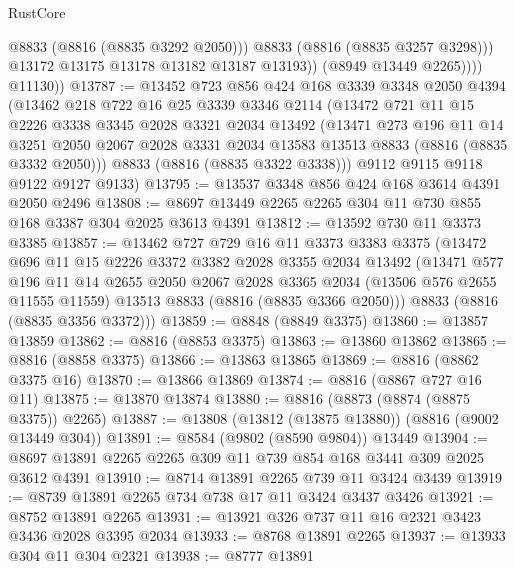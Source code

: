 \begin{lexlean}{RustCore}
\begin{coremodule}
                      @8833
                      (@8816 (@8835 @3292 @2050)))
                    @8833
                    (@8816 (@8835 @3257 @3298)))
                  @13172
                  @13175
                  @13178
                  @13182
                  @13187
                  @13193))
              (@8949 @13449 @2265))))
        @11130))
@13787 := @13452
    @723
    @856
    @424
    @168
    @3339
    @3348
    @2050
    @4394
    (@13462
      @218
      @722
      @16
      @25
      @3339
      @3346
      @2114
      (@13472
        @721
        @11
        @15
        @2226
        @3338
        @3345
        @2028
        @3321
        @2034
        @13492
        (@13471
          @273
          @196
          @11
          @14
          @3251
          @2050
          @2067
          @2028
          @3331
          @2034
          @13583
          @13513
          @8833
          (@8816 (@8835 @3332 @2050)))
        @8833
        (@8816 (@8835 @3322 @3338)))
      @9112
      @9115
      @9118
      @9122
      @9127
      @9133)
@13795 := @13537 @3348 @856 @424 @168 @3614 @4391 @2050 @2496
@13808 := @8697 @13449 @2265 @2265 @304 @11 @730 @855 @168 @3387 @304 @2025 @3613 @4391
@13812 := @13592 @730 @11 @3373 @3385
@13857 := @13462
    @727
    @729
    @16
    @11
    @3373
    @3383
    @3375
    (@13472
      @696
      @11
      @15
      @2226
      @3372
      @3382
      @2028
      @3355
      @2034
      @13492
      (@13471
        @577
        @196
        @11
        @14
        @2655
        @2050
        @2067
        @2028
        @3365
        @2034
        (@13506 @576 @2655 @11555 @11559)
        @13513
        @8833
        (@8816 (@8835 @3366 @2050)))
      @8833
      (@8816 (@8835 @3356 @3372)))
@13859 := @8848 (@8849 @3375)
@13860 := @13857 @13859
@13862 := @8816 (@8853 @3375)
@13863 := @13860 @13862
@13865 := @8816 (@8858 @3375)
@13866 := @13863 @13865
@13869 := @8816 (@8862 @3375 @16)
@13870 := @13866 @13869
@13874 := @8816 (@8867 @727 @16 @11)
@13875 := @13870 @13874
@13880 := @8816 (@8873 (@8874 (@8875 @3375)) @2265)
@13887 := @13808 (@13812 (@13875 @13880)) (@8816 (@9002 @13449 @304))
@13891 := @8584 (@9802 (@8590 @9804)) @13449
@13904 := @8697 @13891 @2265 @2265 @309 @11 @739 @854 @168 @3441 @309 @2025 @3612 @4391
@13910 := @8714 @13891 @2265 @739 @11 @3424 @3439
@13919 := @8739 @13891 @2265 @734 @738 @17 @11 @3424 @3437 @3426
@13921 := @8752 @13891 @2265
@13931 := @13921 @326 @737 @11 @16 @2321 @3423 @3436 @2028 @3395 @2034
@13933 := @8768 @13891 @2265
@13937 := @13933 @304 @11 @304 @2321
@13938 := @8777 @13891

\end{coremodule}
\end{lexlean}
